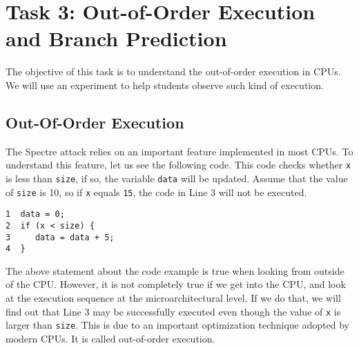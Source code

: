 

\newcommand{\sideChannelFigs}{../Meltdown_Attack/Figs}





\section{Task 3: Out-of-Order Execution and Branch Prediction}

The objective of this task is to understand the out-of-order execution
in CPUs. We will use an experiment to help students observe
such kind of execution. 



\subsection{Out-Of-Order Execution} 

The Spectre attack relies on an important feature implemented in most
CPUs.  To understand this feature, let us see the following code. 
This code checks whether \texttt{x} is less than \texttt{size}, if so,
the variable \texttt{data} will be updated. Assume that the value of
\texttt{size} is 10, so if \texttt{x} equals \texttt{15}, 
the code in Line 3 will not be executed.  

\begin{lstlisting}
1  data = 0;
2  if (x < size) {   
3     data = data + 5; 
4  }
\end{lstlisting}
 

The above statement about the code example is true when looking from outside of the CPU.
However, it is not completely true if we get into the CPU, and look at the execution sequence
at the microarchitectural level. If we do that, we will find out that
Line 3 may be successfully executed even though the value of \texttt{x} is 
larger than \texttt{size}. This is due to an important optimization technique adopted by
modern CPUs. It is called out-of-order execution.


